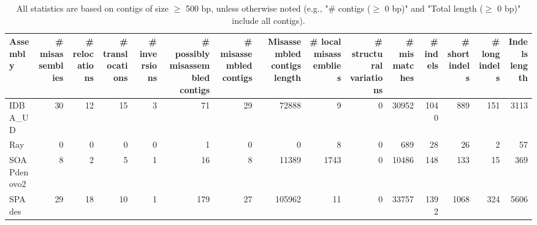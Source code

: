 \documentclass[12pt,a4paper]{article}
\begin{document}
\begin{table}[ht]
\begin{center}
\caption{All statistics are based on contigs of size $\geq$ 500 bp, unless otherwise noted (e.g., "\# contigs ($\geq$ 0 bp)" and "Total length ($\geq$ 0 bp)" include all contigs).}
\begin{tabular}{|l*{14}{|r}|}
\hline
Assembly & \# misassemblies &     \# relocations &     \# translocations &     \# inversions & \# possibly misassembled contigs & \# misassembled contigs & Misassembled contigs length & \# local misassemblies & \# structural variations & \# mismatches & \# indels &     \# short indels &     \# long indels & Indels length \\ \hline
IDBA\_UD & 30 & 12 & 15 & 3 & 71 & 29 & 72888 & 9 & 0 & 30952 & 1040 & 889 & 151 & 3113 \\ \hline
Ray & 0 & 0 & 0 & 0 & 1 & 0 & 0 & 8 & 0 & 689 & 28 & 26 & 2 & 57 \\ \hline
SOAPdenovo2 & 8 & 2 & 5 & 1 & 16 & 8 & 11389 & 1743 & 0 & 10486 & 148 & 133 & 15 & 369 \\ \hline
SPAdes & 29 & 18 & 10 & 1 & 179 & 27 & 105962 & 11 & 0 & 33757 & 1392 & 1068 & 324 & 5606 \\ \hline
\end{tabular}
\end{center}
\end{table}
\end{document}
